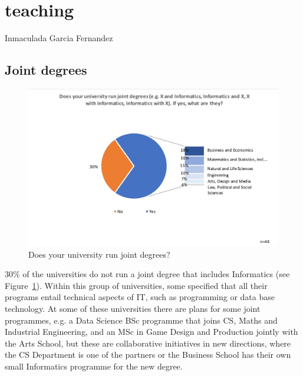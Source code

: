 \pagebreak
\section{teaching}

Inmaculada Garcia Fernandez
\subsection {Joint degrees}

\begin{figure}[h]
\includegraphics[width = \linewidth]{charts/2a.jpg}
\caption{Does your university run joint degrees?}
\label{sect3:joint}
\end{figure}

30\% of the universities do not run a joint degree that includes Informatics (see Figure~\ref{sect3:joint}). Within this group of universities, some specified that all their programs entail technical aspects of IT, such as programming or data base technology.  At some of these universities there are plans for some joint programmes, e.g. a Data Science BSc programme that joins CS, Maths and Industrial Engineering, and an MSc in Game Design and Production jointly with the Arts School, but these are collaborative initiatives in new directions, where the CS Department is one of the partners or the Business School has their own small Informatics programme for the new degree.

